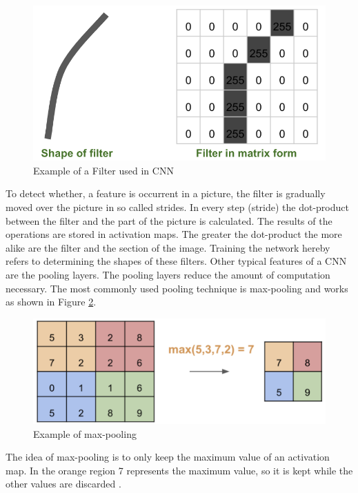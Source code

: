\begin{figure}[h]
	\centering
	\includegraphics[scale=0.7]{Figures/filter}
	\decoRule
	\caption[Kernel]{Example of a Filter used in CNN}
	\label{fig:filter}
\end{figure}

To detect whether, a feature is occurrent in a picture, the filter is gradually moved over the picture in so called strides. In every step (stride) the dot-product between the filter and the part of the picture is calculated. The results of the operations are stored in activation maps.  The greater the dot-product the more alike are the filter and the section of the image. Training the network hereby refers to determining the shapes of these filters.
Other typical features of a CNN are the pooling layers. The pooling layers reduce the amount of computation necessary. The most commonly used pooling technique is max-pooling and works as shown in Figure \ref{fig:pooling}.

\begin{figure}[h]
	\centering
	\includegraphics[scale=0.2]{Figures/pooling}
	\decoRule
	\caption[Pooling]{Example of max-pooling}
	\label{fig:pooling}
\end{figure}

The idea of max-pooling is to only keep the maximum value of an activation map. In the orange region 7 represents the maximum value, so it is kept while the other values are discarded \parencite{RichStureborg2019}.

